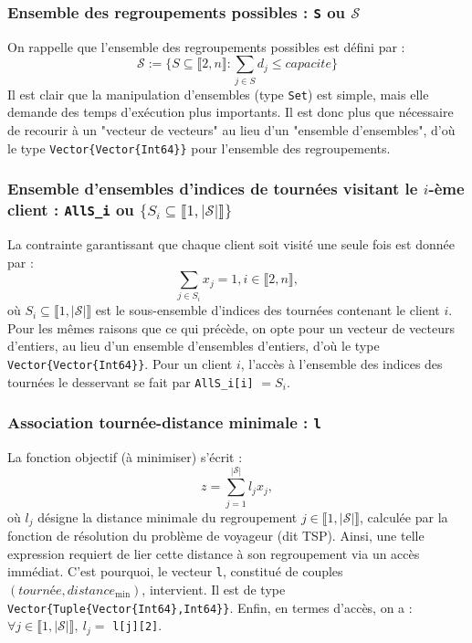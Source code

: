 \documentclass[french, 11pt, a4paper]{article} %
\newcommand{\Sc}{\mathcal{S}} %
\newcommand{\smb}{\smallbreak}
\begin{document}
\subsubsection{Ensemble des regroupements possibles : \texttt{S} ou $\Sc$}
On rappelle que l'ensemble des regroupements possibles est défini par :
\[\Sc := \Bigg\{ S \subseteq \llbracket 2,n \rrbracket : \sum_{j \in S} d_j \leq capacite \Bigg\} \]
Il est clair que la manipulation d'ensembles (type \verb+Set+) est simple, mais elle demande des temps d'exécution plus importants.
Il est donc plus que nécessaire de recourir à un "vecteur de vecteurs" au lieu d'un "ensemble d'ensembles", d'où
le type \verb+Vector{Vector{Int64}}+ pour l'ensemble des regroupements.

\subsubsection{Ensemble d'ensembles d'indices de tournées visitant le $i$-ème client : \texttt{AllS\_i} ou $\{S_i \subseteq \llbracket 1, |\Sc| \rrbracket\}$ }
La contrainte garantissant que chaque client soit visité une seule fois est donnée par :
\[ \sum_{j \in S_i} x_j = 1, i \in \llbracket 2,n \rrbracket, \]
où $S_i \subseteq \llbracket 1, |\Sc| \rrbracket$ est le sous-ensemble d'indices des tournées
contenant le client $i$.
Pour les mêmes raisons que ce qui précède, on opte pour un vecteur de vecteurs d'entiers, au lieu d'un ensemble d'ensembles d'entiers,
d'où le type \verb+Vector{Vector{Int64}}+.
\smb Pour un client $i$, l'accès à l'ensemble des indices des tournées le desservant se fait par \texttt{AllS\_i[i]} $=S_i$.

\subsubsection{Association tournée-distance minimale : \texttt{l}}
La fonction objectif (à minimiser) s'écrit :
\[ z = \sum_{j=1}^{|\Sc|} l_j x_j,\]
où $l_j$ désigne la distance minimale du regroupement $j \in \llbracket 1,|\Sc| \rrbracket$, calculée par la
fonction de résolution du problème de voyageur (dit TSP).
Ainsi, une telle expression requiert de lier cette distance à son regroupement via un accès immédiat.
C'est pourquoi, le vecteur \verb+l+, constitué de couples $(tourn \text{é} e,distance_{\text{min}})$, intervient.
Il est de type \verb+Vector{Tuple{Vector{Int64},Int64}}+.
\smb Enfin, en termes d'accès, on a : $\forall j \in \llbracket 1,|\Sc| \rrbracket, \: l_j = $ \texttt{l[j][2]}.
\end{document}
